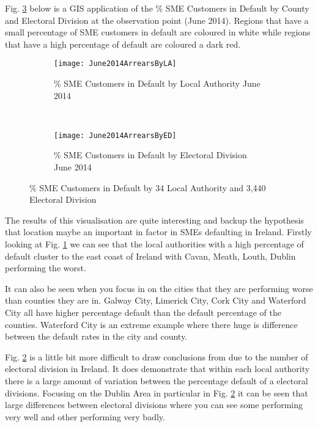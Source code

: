 Fig. \ref{fig:SMEArrearsLAED} below is a GIS application of the \% SME Customers in Default by County and Electoral Division at the observation point (June 2014). Regions that have a small percentage of SME customers in default are coloured in white while regions that have a high percentage of default are coloured a dark red.
\begin{figure}[H]
	\begin{adjustwidth}{-2cm}{-2cm}
	\begin{subfigure}[b]{0.55\textwidth}
		\captionsetup{font=scriptsize}
		\texttt{[image: June2014ArrearsByLA]}
		\caption{\% SME Customers in Default by Local Authority June 2014}\label{fig:June2014ArrearsByLA}
	\end{subfigure} ~\quad
	\begin{subfigure}[b]{0.55\textwidth}
		\captionsetup{font=scriptsize}
		\texttt{[image: June2014ArrearsByED]}
		\caption{\% SME Customers in Default by Electoral Division June 2014}
		\label{fig:June2014ArrearsByED}
	\end{subfigure}
	\caption{\% SME Customers in Default by 34 Local Authority and 3,440 Electoral Division}
	\label{fig:SMEArrearsLAED}
	\end{adjustwidth}
\end{figure}

The results of this visualisation are quite interesting and backup the hypothesis that location maybe an important in factor in SMEs defaulting in Ireland. Firstly looking at Fig. \ref{fig:June2014ArrearsByLA} we can see that the local authorities with a high percentage of default cluster to the east coast of Ireland with Cavan, Meath, Louth, Dublin performing the worst. 

It can also be seen when you focus in on the cities that they are performing worse than counties they are in. Galway City, Limerick City, Cork City and Waterford City all have higher percentage default than the default percentage of the counties. Waterford City is an extreme example where there huge is difference between the default rates in the city and county.

Fig. \ref{fig:June2014ArrearsByED} is a little bit more difficult to draw conclusions from due to the number of electoral division in Ireland. It does demonstrate that within each local authority there is a large amount of variation between the percentage default of a electoral divisions. Focusing on the Dublin Area in particular in Fig. \ref{fig:June2014ArrearsByED} it can be seen that large differences between electoral divisions where you can see some performing very well and other performing very badly. 
 
